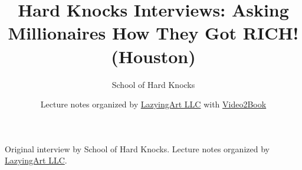 \documentclass[11pt,oneside]{book}
\begin{document}
\frontmatter
\title{Hard Knocks Interviews: Asking Millionaires How They Got RICH! (Houston)}
\author{School of Hard Knocks}
\date{Lecture notes organized by \href{https://lazying.art}{LazyingArt LLC} with \href{https://github.com/lachlanchen/Video2Book}{Video2Book}}
\maketitle
\begin{center}
\small Original interview by School of Hard Knocks. Lecture notes organized by \href{https://lazying.art}{LazyingArt LLC}.
\end{center}
\clearpage
\mainmatter

\end{document}
